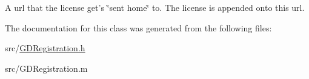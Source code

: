 A url that the license get's \char`\"{}sent home\char`\"{} to. The license is appended onto this url. 

The documentation for this class was generated from the following files:\begin{DoxyCompactItemize}
\item 
src/\hyperlink{_g_d_registration_8h}{GDRegistration.h}\item 
src/GDRegistration.m\end{DoxyCompactItemize}
